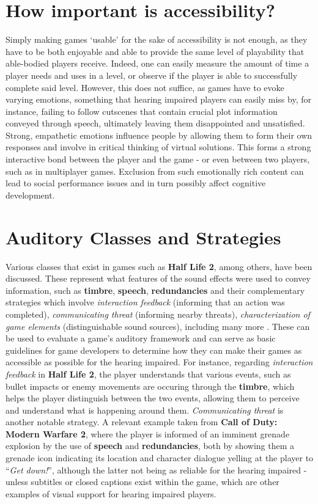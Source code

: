\documentclass{scrartcl}
\begin{document}
\section{How important is accessibility?}
Simply making games `usable' for the sake of accessibility is not enough, as they have to be both enjoyable and able to provide the same level of playability that able-bodied players receive. Indeed, one can easily measure the amount of time a player needs and uses in a level, or observe if the player is able to successfully complete said level. \cite{Arch} However, this does not suffice, as games have to evoke varying emotions, something that hearing impaired players can easily miss by, for instance, failing to follow cutscenes that contain crucial plot information conveyed through speech, ultimately leaving them disappointed and unsatisfied. Strong, empathetic emotions influence people by allowing them to form their own responses and involve in critical thinking of virtual solutions. This forms a strong interactive bond between the player and the game - or even between two players, such as in multiplayer games. Exclusion from such emotionally rich content can lead to social performance issues and in turn possibly affect cognitive development. \cite{Sebanz} \cite{Chartrand} 

\section{Auditory Classes and Strategies}
Various classes that exist in games such as \textbf{Half Life 2}, among others, have been discussed. These represent what features of the sound effects were used to convey information, such as \textbf{timbre}, \textbf{speech}, \textbf{redundancies} and their complementary strategies which involve \textit{interaction feedback} (informing that an action was completed), \textit{communicating threat} (informing nearby threats), \textit{characterization of game elements} (distinguishable sound sources), including many more \cite{Flav} \cite{Denise}. These can be used to evaluate a game's auditory framework and can serve as basic guidelines for game developers to determine how they can make their games as accessible as possible for the hearing impaired. For instance, regarding \textit{interaction feedback} in \textbf{Half Life 2}, the player understands that various events, such as bullet impacts or enemy movements are occuring through the \textbf{timbre}, which helps the player distinguish between the two events, allowing them to perceive and understand what is happening around them. \textit{Communicating threat} is another notable strategy. A relevant example taken from \textbf{Call of Duty: Modern Warfare 2}, where the player is informed of an imminent grenade explosion by the use of \textbf{speech} and \textbf{redundancies}, both by showing them a grenade icon indicating its location and character dialogue yelling at the player to  ``\textit{Get down!}'', although the latter not being as reliable for the hearing impaired - unless subtitles or closed captions exist within the game, which are other examples of visual support for hearing impaired players. \cite{Denise}
\end{document}

